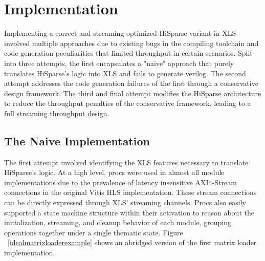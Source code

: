 \chapter{Implementation}

Implementing a correct and streaming optimized HiSparse variant in XLS involved multiple approaches due to existing bugs in the compiling toolchain and code generation peculiarities that limited throughput in certain scenarios. Split into three attempts, the first encapsulates a "naive" approach that purely translates HiSparse's logic into XLS and fails to generate verilog. The second attempt addresses the code generation failures of the first through a conservative design framework. The third and final attempt modifies the HiSparse architecture to reduce the throughput penalties of the conservative framework, leading to a full streaming throughput design.

\section{The Naive Implementation}
The first attempt involved identifying the XLS features necessary to translate HiSparse's logic. At a high level, procs were used in almost all module implementations due to the prevalence of latency insensitive AXI4-Stream connections in the original Vitis HLS implementation. These stream connections can be directly expressed through XLS' streaming channels. Procs also easily supported a state machine structure within their activation to reason about the initialization, streaming, and cleanup behavior of each module, grouping operations together under a single thematic state. Figure ~\ref{idealmatrixloaderexample} shows an abridged version of the first matrix loader implementation. 

